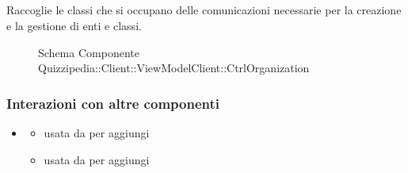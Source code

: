 \subsection{}
Raccoglie le classi che si occupano delle comunicazioni necessarie per la creazione e la gestione di enti e classi.
\begin{figure}[H]
\centering
\noindent{}
\caption[Schema Componente Quizzipedia::Client::ViewModelClient::CtrlOrganization]{Schema Componente Quizzipedia::Client::ViewModelClient::CtrlOrganization}
\end{figure}
\subsubsection{Interazioni con altre componenti}
\begin{itemize}
\item {}
\begin{itemize}
\item usata da  per aggiungi
\item usata da  per aggiungi
\end{itemize}
\end{itemize}
